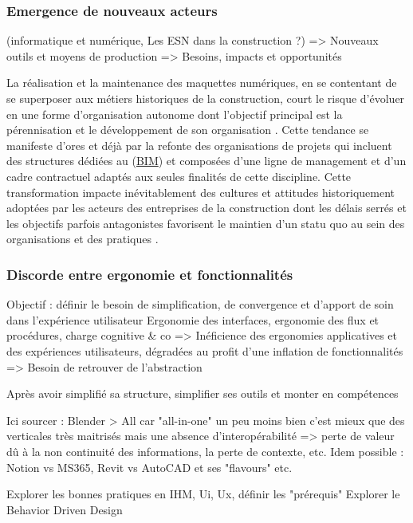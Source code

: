 \documentclass[a4paper,12pt]{article}
\begin{document}
\subsubsection{Emergence de nouveaux acteurs}
\label{sec:org68e89b9}
(informatique et numérique, Les ESN dans la construction ?)
=> Nouveaux outils et moyens de production
=> Besoins, impacts et opportunités

La réalisation et la maintenance des maquettes numériques, en se contentant de se superposer aux métiers historiques de la construction, court le risque d’évoluer en une forme d’organisation autonome dont l’objectif principal est la pérennisation et le développement de son organisation \autocite{lourauAnalyseInstitutionnelleQuestion1973}. Cette tendance se manifeste d’ores et déjà par la refonte des organisations de projets qui incluent des structures dédiées au  (\protect\hyperlink{gls-1}{\label{gls-1-use-1}BIM}) et composées d’une ligne de management et d’un cadre contractuel adaptés aux seules finalités de cette discipline.
Cette transformation impacte inévitablement des cultures et attitudes historiquement adoptées par les acteurs des entreprises de la construction dont les délais serrés et les objectifs parfois antagonistes favorisent le maintien d’un statu quo au sein des organisations et des pratiques \autocite{lindbladBIMImplementationOrganisational2015,paulagordogregorioContinuiteInformationnelleDans2023}. 
\subsubsection{Discorde entre ergonomie et fonctionnalités}
\label{sec:orgc4d086f}
Objectif : définir le besoin de simplification, de convergence et d'apport de soin dans l'expérience utilisateur
Ergonomie des interfaces, ergonomie des flux et procédures, charge cognitive \& co
=> Inéficience des ergonomies applicatives et des expériences utilisateurs, dégradées au profit d'une inflation de fonctionnalités
=> Besoin de retrouver de l'abstraction

Après avoir simplifié sa structure, simplifier ses outils et monter en compétences

Ici sourcer : Blender > All car "all-in-one" un peu moins bien c'est mieux que des verticales très maitrisés mais une absence d'interopérabilité => perte de valeur dû à la non continuité des informations, la perte de contexte, etc.
Idem possible : Notion vs MS365, Revit vs AutoCAD et ses "flavours"
etc.

Explorer les bonnes pratiques en IHM, Ui, Ux, définir les "prérequis" 
Explorer le Behavior Driven Design 
\end{document}
